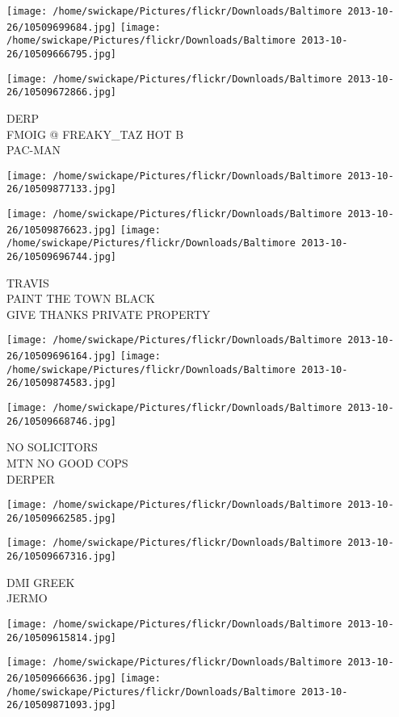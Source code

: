 \documentclass[10pt,letterpaper]{article}
\begin{document}
\texttt{[image: /home/swickape/Pictures/flickr/Downloads/Baltimore 2013-10-26/10509699684.jpg]}
\texttt{[image: /home/swickape/Pictures/flickr/Downloads/Baltimore 2013-10-26/10509666795.jpg]}

\vspace{0.25in}
\texttt{[image: /home/swickape/Pictures/flickr/Downloads/Baltimore 2013-10-26/10509672866.jpg]}

DERP\\
FMOIG @ FREAKY\_TAZ HOT B\\
PAC{-}MAN
\pagebreak

\texttt{[image: /home/swickape/Pictures/flickr/Downloads/Baltimore 2013-10-26/10509877133.jpg]}

\vspace{0.25in}
\texttt{[image: /home/swickape/Pictures/flickr/Downloads/Baltimore 2013-10-26/10509876623.jpg]}
\texttt{[image: /home/swickape/Pictures/flickr/Downloads/Baltimore 2013-10-26/10509696744.jpg]}

TRAVIS\\
PAINT THE TOWN BLACK\\
GIVE THANKS PRIVATE PROPERTY
\pagebreak

\texttt{[image: /home/swickape/Pictures/flickr/Downloads/Baltimore 2013-10-26/10509696164.jpg]}
\texttt{[image: /home/swickape/Pictures/flickr/Downloads/Baltimore 2013-10-26/10509874583.jpg]}

\texttt{[image: /home/swickape/Pictures/flickr/Downloads/Baltimore 2013-10-26/10509668746.jpg]}

NO SOLICITORS\\
MTN NO GOOD COPS\\
DERPER
\pagebreak

\texttt{[image: /home/swickape/Pictures/flickr/Downloads/Baltimore 2013-10-26/10509662585.jpg]}

\vspace{0.25in}
\texttt{[image: /home/swickape/Pictures/flickr/Downloads/Baltimore 2013-10-26/10509667316.jpg]}

DMI GREEK\\
JERMO
\pagebreak

\texttt{[image: /home/swickape/Pictures/flickr/Downloads/Baltimore 2013-10-26/10509615814.jpg]}

\vspace{0.25in}
\texttt{[image: /home/swickape/Pictures/flickr/Downloads/Baltimore 2013-10-26/10509666636.jpg]}
\texttt{[image: /home/swickape/Pictures/flickr/Downloads/Baltimore 2013-10-26/10509871093.jpg]}
\end{document}
